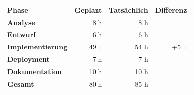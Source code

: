 \begin{tabular}{lrrr}
\rowcolor{heading}\textbf{Phase} & \textbf{Geplant} & \textbf{Tatsächlich} & \textbf{Differenz} \\
\textbf{Analyse} & 8 h  & 8 h  &  \\
\rowcolor{odd}\textbf{Entwurf} & 6 h   & 6 h  &  \\
\textbf{Implementierung} & 49 h  & 54 h  & +5 h \\
\rowcolor{odd}\textbf{Deployment} & 7 h   & 7 h   &  \\
\textbf{Dokumentation} & 10 h   & 10 h  &  \\
\hline
\hline
\rowcolor{odd}\textbf{Gesamt} & 80 h  & 85 h  &  \\
\end{tabular}
